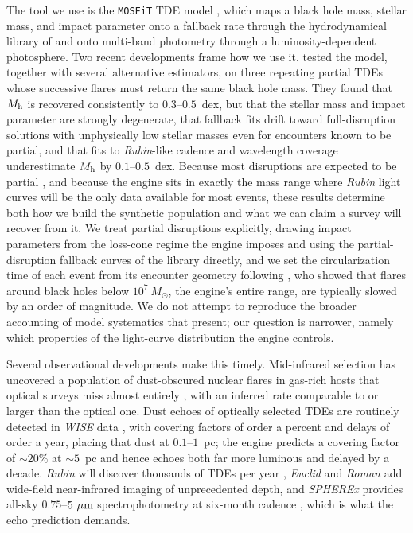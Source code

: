 \documentclass[twocolumn,pdftex]{aastex701}
\newcommand{\msun}{M_{\odot}\xspace}
\newcommand{\mosfit}{{\tt MOSFiT}\xspace}
\newcommand{\um}{\mu{\rm m}\xspace}
\newcommand{\lsst}{{\it Rubin}\xspace}
\newcommand{\wise}{{\it WISE}\xspace}
\newcommand{\romantel}{{\it Roman}\xspace}
\newcommand{\euclid}{{\it Euclid}\xspace}
\newcommand{\spherex}{{\it SPHEREx}\xspace}
\begin{document}
The tool we use is the \mosfit TDE model \citep{Guillochon:2018a,Mockler:2019a}, which maps a black hole mass, stellar mass, and impact parameter onto a fallback rate through the hydrodynamical library of \citet{Guillochon:2013a} and onto multi-band photometry through a luminosity-dependent photosphere. Two recent developments frame how we use it. \citet{Angus:2026a} tested the model, together with several alternative estimators, on three repeating partial TDEs whose successive flares must return the same black hole mass. They found that $M_{\rm h}$ is recovered consistently to $0.3$--$0.5$~dex, but that the stellar mass and impact parameter are strongly degenerate, that fallback fits drift toward full-disruption solutions with unphysically low stellar masses even for encounters known to be partial, and that fits to \lsst-like cadence and wavelength coverage underestimate $M_{\rm h}$ by $0.1$--$0.5$~dex. Because most disruptions are expected to be partial \citep{Stone:2016a,Krolik:2020a,Chen:2021a,Zhong:2022a,Bortolas:2023a}, and because the engine sits in exactly the mass range where \lsst light curves will be the only data available for most events, these results determine both how we build the synthetic population and what we can claim a survey will recover from it. We treat partial disruptions explicitly, drawing impact parameters from the loss-cone regime the engine imposes and using the partial-disruption fallback curves of the library directly, and we set the circularization time of each event from its encounter geometry following \citet{Guillochon:2015a}, who showed that flares around black holes below $10^{7}~\msun$, the engine's entire range, are typically slowed by an order of magnitude. We do not attempt to reproduce the broader accounting of model systematics that \citet{Angus:2026a} present; our question is narrower, namely which properties of the light-curve distribution the engine controls.

Several observational developments make this timely. Mid-infrared selection has uncovered a population of dust-obscured nuclear flares in gas-rich hosts that optical surveys miss almost entirely \citep{Jiang:2021a,Masterson:2024a}, with an inferred rate comparable to or larger than the optical one. Dust echoes of optically selected TDEs are routinely detected in \wise data \citep{vanVelzen:2016a,Jiang:2016a,Lu:2016a,Jiang:2021b}, with covering factors of order a percent and delays of order a year, placing that dust at $0.1$--$1$~pc; the engine predicts a covering factor of $\sim 20\%$ at $\sim 5$~pc and hence echoes both far more luminous and delayed by a decade. \lsst \citep{Ivezic:2019a} will discover thousands of TDEs per year \citep{Bricman:2020a}, \euclid and \romantel add wide-field near-infrared imaging of unprecedented depth, and \spherex provides all-sky $0.75$--$5~\um$ spectrophotometry at six-month cadence \citep{Dore:2018a}, which is what the echo prediction demands.
\end{document}
